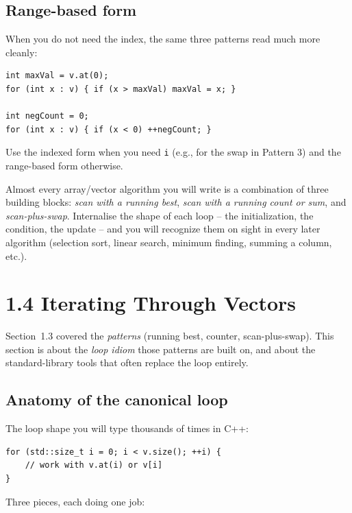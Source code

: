 \documentclass[11pt]{article}
\begin{document}
\subsection{Range-based form}

When you do not need the index, the same three patterns read much more
cleanly:
\begin{lstlisting}
int maxVal = v.at(0);
for (int x : v) { if (x > maxVal) maxVal = x; }

int negCount = 0;
for (int x : v) { if (x < 0) ++negCount; }
\end{lstlisting}

Use the indexed form when you need \texttt{i} (e.g., for the swap in
Pattern 3) and the range-based form otherwise.

\begin{ideabox}
Almost every array/vector algorithm you will write is a combination of
three building blocks: \emph{scan with a running best}, \emph{scan
with a running count or sum}, and \emph{scan-plus-swap}. Internalise
the shape of each loop -- the initialization, the condition, the
update -- and you will recognize them on sight in every later
algorithm (selection sort, linear search, minimum finding, summing a
column, etc.).
\end{ideabox}

\section{1.4 Iterating Through Vectors}

Section~1.3 covered the \emph{patterns} (running best, counter, scan-plus-swap).
This section is about the \emph{loop idiom} those patterns are built on,
and about the standard-library tools that often replace the loop entirely.

\subsection{Anatomy of the canonical loop}

The loop shape you will type thousands of times in C++:
\begin{lstlisting}
for (std::size_t i = 0; i < v.size(); ++i) {
    // work with v.at(i) or v[i]
}
\end{lstlisting}

Three pieces, each doing one job:
\end{document}
